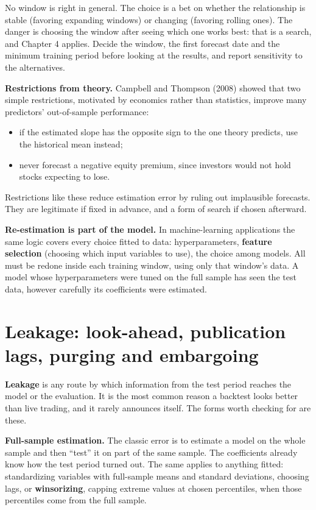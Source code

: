 No window is right in general. The choice is a bet on whether the relationship is stable (favoring expanding windows) or changing (favoring rolling ones). The danger is choosing the window after seeing which one works best: that is a search, and Chapter 4 applies. Decide the window, the first forecast date and the minimum training period before looking at the results, and report sensitivity to the alternatives.

\textbf{Restrictions from theory.} Campbell and Thompson (2008) showed that two simple restrictions, motivated by economics rather than statistics, improve many predictors' out-of-sample performance:

\begin{itemize}
  \item if the estimated slope has the opposite sign to the one theory predicts, use the historical mean instead;
  \item never forecast a negative equity premium, since investors would not hold stocks expecting to lose.
\end{itemize}

Restrictions like these reduce estimation error by ruling out implausible forecasts. They are legitimate if fixed in advance, and a form of search if chosen afterward.

\textbf{Re-estimation is part of the model.} In machine-learning applications the same logic covers every choice fitted to data: hyperparameters, \textbf{feature selection} (choosing which input variables to use), the choice among models. All must be redone inside each training window, using only that window's data. A model whose hyperparameters were tuned on the full sample has seen the test data, however carefully its coefficients were estimated.

\section{Leakage: look-ahead, publication lags, purging and embargoing}
\label{sec:05-leakage}

\textbf{Leakage} is any route by which information from the test period reaches the model or the evaluation. It is the most common reason a backtest looks better than live trading, and it rarely announces itself. The forms worth checking for are these.

\textbf{Full-sample estimation.} The classic error is to estimate a model on the whole sample and then ``test'' it on part of the same sample. The coefficients already know how the test period turned out. The same applies to anything fitted: standardizing variables with full-sample means and standard deviations, choosing lags, or \textbf{winsorizing}, capping extreme values at chosen percentiles, when those percentiles come from the full sample.

